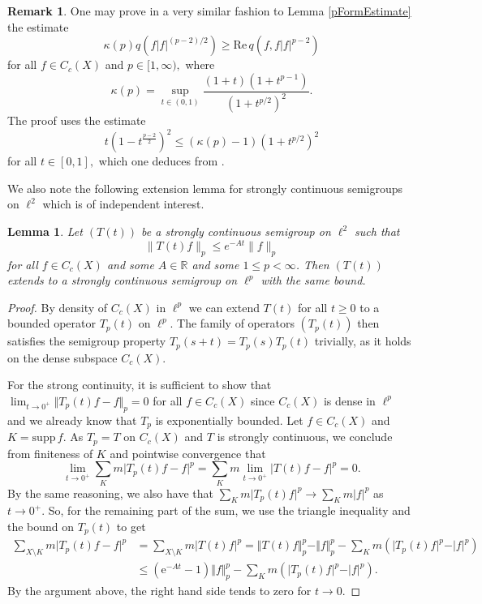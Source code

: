 \documentclass[10pt]{amsart}
\newtheorem{lemma}[theorem]{Lemma}
\theoremstyle{definition}
\newtheorem*{remark}{Remark}
\begin{document}
\begin{remark}
    One may prove in a very similar fashion to Lemma \ref{pFormEstimate} the estimate
    \[\kappa(p)q( f\vert  f\vert^{(p-2)\slash 2})\geq\mathrm{Re}\, q(f,f\vert  f\vert^{p-2})\]
    for all $f\in C_c(X)$ and $p\in [1,\infty),$ where \[\kappa(p) = \sup_{t\in(0,1)}\frac{(1+t)(1+t^{p-1})}{(1+t^{p\slash 2})^2}.\] The proof uses the estimate \[t(1-t^{\frac{p-2}{2}})^2\leq(\kappa(p)-1)(1+t^{p\slash 2})^2\] for all $t\in [0,1],$ which one deduces from \cite[Lemma 2.1, inequality~(2.5)]{LiSe}.
\end{remark}


We also note the following extension lemma for strongly continuous semigroups on $\ell^2$ which is of independent interest.

\begin{lemma}\label{strongcont}
    Let $ (T({t})) $ be a strongly continuous semigroup on $ \ell^{2} $ such that \[ \|T({t})f\|_{p} \leq e^{-At}\|f\|_{p} \] for all $ f \in C_c(X) $ and some $ A \in \mathbb{R} $ and some $ 1\leq p <\infty $. Then $ (T({t})) $ extends to a strongly continuous semigroup on $ \ell^{p} $ with the same bound.
\end{lemma}
\begin{proof}
By density of $C_c(X)$ in $\ell^p$ we can extend $T(t)$ for all $t\geq 0$ to a bounded operator $T_p(t)$ on $\ell^p.$ The family of operators $(T_p(t))$ then satisfies the semigroup property $T_p(s+t) = T_p(s)T_p(t)$ trivially, as it holds on the dense subspace $C_c(X).$ 

For the strong continuity, it is sufficient to show that      $\lim_{t\rightarrow0^+}\Vert T_p(t)  f-  f\Vert_p=0$ for all $  f\in C_c(X)$ since $C_c(X)$ is dense in $\ell^p$ and we already know that $T_p$ is exponentially bounded. Let $  f\in C_c(X)$ and $K= \mathrm{supp}\,  f.$ As $T_p = T$ on $C_c(X)$ and $T$ is strongly continuous, we conclude from finiteness of $K$ and pointwise convergence  that 
 \[\lim_{t\rightarrow 0^+}\sum_K m\vert T_p(t)  f-f\vert^{p}=\sum_K m\lim_{t\rightarrow 0^+}\vert T(t)  f-f\vert^{p}=0 .\] 
By the same reasoning, we also have that
    \(\sum_K m\vert T_p(t)  f\vert^{p}\to \sum_K m\vert  f\vert^p \) as ${t\rightarrow 0^+}$. So, for the remaining part of the sum, we use the triangle inequality and the bound on $T_p(t)$ to get 
    \begin{align*}
        \sum_{X\setminus K}m\vert T_p(t)  f-  f\vert^p & = \sum_{X\setminus K  }m\vert T(t)  f\vert^p 
        =\Vert T(t)  f\Vert_p^{p} - \Vert   f\Vert_p^{p}  -\! \sum_{K   }m(\vert T_p(t)  f\vert^p-\vert   f\vert^p) 
        \\
        &\leq (\mathrm{e}^{-At}-1)\Vert  f\Vert_p^{p} -\sum_{K}m(\vert T_p(t)  f\vert^p-\vert   f\vert^p) .
    \end{align*}
By the argument above, the right hand side tends to zero for  $t\to0.$   
\end{proof}
\end{document}
